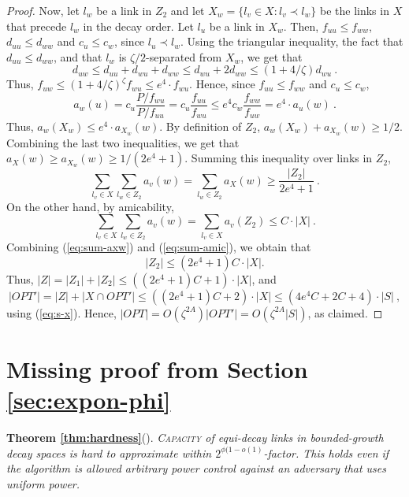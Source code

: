 \documentclass[11pt]{amsart}
\newcommand{\prob}[1]{\textsc{#1}}
\begin{document}
\begin{proof}
Now, let $l_w$ be a link in $Z_2$ and let $X_w = \{l_v \in X : l_v
\prec l_w\}$ be the links in $X$ that precede $l_w$ in the decay
order.  Let $l_u$ be a link in $X_w$.
Then, $f_{uu} \le f_{ww}$, $d_{uu} \le d_{ww}$ and $c_u \le c_w$,
since $l_u \prec l_w$.
Using the triangular inequality, the fact that $d_{uu} \le d_{ww}$,
and that $l_w$ is $\zeta/2$-separated from $X_w$, we get that
\[ d_{uw} \le d_{uu} + d_{wu} + d_{ww} \le d_{wu} + 2 d_{ww} 
   \le (1 + 4/\zeta) d_{wu}\ . \]
Thus, $f_{uw} \le (1 + 4/\zeta)^\zeta f_{wu} \le e^4 \cdot f_{wu}$.
Hence, since $f_{uu} \le f_{ww}$ and $c_u \le c_w$, 
\[ a_w(u) = c_u \frac{P/f_{wu}}{P/f_{uu}} 
          = c_u \frac{f_{uu}}{f_{wu}} \le e^4 c_w \frac{f_{ww}}{f_{uw}} = e^4 \cdot a_u(w)\ . \]
Thus, $a_w(X_w) \le e^4 \cdot a_{X_w}(w)$.
By definition of $Z_2$, $a_w(X_w) + a_{X_w}(w) \ge 1/2$.  
Combining the last two inequalities, we get that 
$a_X(w) \ge a_{X_w}(w) \ge 1/(2e^4+1)$.
Summing this inequality over links in $Z_2$,
\begin{equation}
\sum_{l_v \in X} \sum_{l_w \in Z_2} a_v(w) = \sum_{l_w \in Z_2} a_X(w) \ge \frac{|Z_2|}{2e^4+1}\ . 
\label{eq:sum-axw}
\end{equation}
On the other hand, by amicability,
\begin{equation}
\sum_{l_v \in X} \sum_{l_w \in Z_2} a_v(w) = \sum_{l_v \in X} a_v(Z_2) \le C \cdot |X|\ .
\label{eq:sum-amic}
\end{equation}
Combining (\ref{eq:sum-axw}) and (\ref{eq:sum-amic}),
we obtain that
\[ |Z_2| \le (2 e^4 +1)C \cdot |X|. \]
Thus, $|Z| = |Z_1| + |Z_2| \le ((2 e^4+1) C +1) \cdot |X|$,
and
\[ |OPT'| = |Z| + |X \cap OPT'| \le ((2 e^4+1) C +2) \cdot |X|
 \le (4 e^4 C +2C+4) \cdot |S| \ , \]
using (\ref{eq:s-x}). Hence, 
$|OPT| = O(\zeta^{2A})|OPT'| = O(\zeta^{2A}|S|)$,
as claimed.
\end{proof}

\section{Missing proof from Section \ref{sec:expon-phi}}



\noindent\textbf{Theorem \ref{thm:hardness}}(\cite{GHWW09}).\emph{
\prob{Capacity} of equi-decay links in bounded-growth decay spaces
is hard to approximate within $2^{\phi(1-o(1)}$-factor.
This holds even if the algorithm is allowed 
arbitrary power control against an adversary that uses uniform power.
} 
\end{document}
